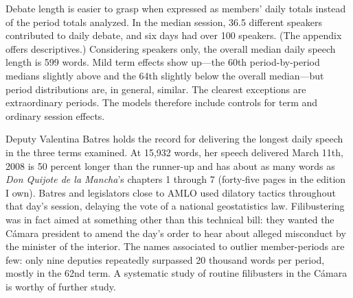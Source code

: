 \documentclass[letter,12pt]{article}
\begin{document}
Debate length is easier to grasp when expressed as members' daily totals instead of the period totals analyzed. In the median session, 36.5 different speakers contributed to daily debate, and six days had over 100 speakers. (The appendix offers descriptives.) Considering speakers only, the overall median daily speech length is 599 words. Mild term effects show up---the 60th period-by-period medians slightly above and the 64th slightly below the overall median---but period distributions are, in general, similar. The clearest exceptions are extraordinary periods. The models therefore include controls for term and ordinary session effects.

Deputy Valentina Batres holds the record for delivering the longest daily speech in the three terms examined. At 15,932 words, her speech delivered March 11th, 2008 is 50 percent longer than the runner-up and has about as many words as \emph{Don Quijote de la Mancha}'s chapters 1 through 7 (forty-five pages in the edition I own). Batres and legislators close to AMLO used dilatory tactics throughout that day's session, delaying the vote of a national geostatistics law. Filibustering was in fact aimed at something other than this technical bill: they wanted the Cámara president to amend the day's order to hear about alleged misconduct by the minister of the interior. The names associated to outlier member-periods are few: only nine deputies repeatedly surpassed 20 thousand words per period, mostly in the 62nd term. A systematic study of routine filibusters in the Cámara is worthy of further study. 





\end{document}
